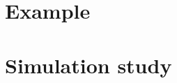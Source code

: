 \documentclass[10pt,a4paper]{article}\usepackage[]{graphicx}\usepackage[]{color}
\begin{document}
\section{Example}






\section{Simulation study}



%
\appendix
%
%
%
%
%
%
%
%
%
%
\end{document}
